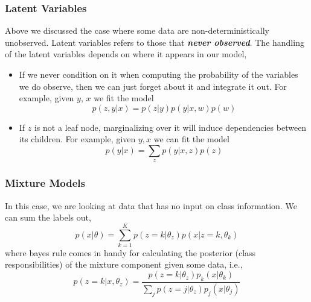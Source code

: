 \documentclass[11pt]{article}
\begin{document}
\subsubsection{Latent Variables}
Above we discussed the case where some data are non-deterministically unobserved. Latent variables refers to those that \textit{\textbf{never observed}}. The handling of the latent variables depends on where it appears in our model,
\begin{itemize}
    \item If we never condition on it when computing the probability of the variables we do observe, then we can just forget about it and integrate it out. For example, given $y$, $x$ we fit the model
        \begin{equation}
            p(z, y | x)=p(z | y) p(y | x, w) p(w)
        \end{equation}
    \item If $z$ is not a leaf node, marginalizing over it will induce dependencies between its children. For example, given $y, x$ we can fit the model 
        \begin{equation}
            p(y | x)=\sum_{z} p(y | x, z) p(z)
        \end{equation}
\end{itemize}

\subsubsection{Mixture Models}
In this case, we are looking at data that has no input on class information. We can sum the labels out,
\begin{equation}
    p(x | \theta)=\sum_{k=1}^{K} p\left(z=k | \theta_{z}\right) p\left(x | z=k, \theta_{k}\right)
\end{equation}
where bayes rule comes in handy for calculating the posterior (class responsibilities) of the mixture component given some data, i.e., 
\begin{equation}
    p\left(z=k | x, \theta_{z}\right)=\frac{p\left(z=k | \theta_{z}\right) p_{k}\left(x | \theta_{k}\right)}{\sum_{j} p\left(z=j | \theta_{z}\right) p_{j}\left(x | \theta_{j}\right)}
\end{equation} 
%
\end{document}
